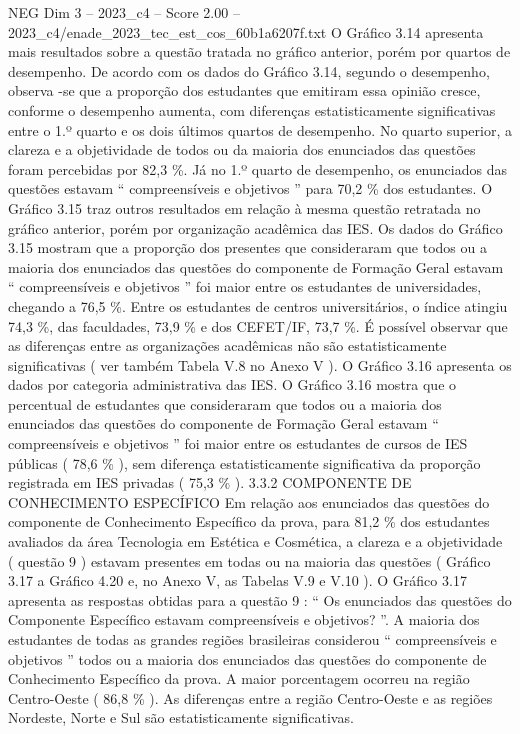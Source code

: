 \begin{textsample}{NEG Dim 3 – 2023\_c4 – Score 2.00 – 2023\_c4/enade\_2023\_tec\_est\_cos\_60b1a6207f.txt}
O Gráfico 3.14 apresenta mais resultados sobre a questão tratada no gráfico anterior, porém por quartos de desempenho.
De acordo com os dados do Gráfico 3.14, segundo o desempenho, observa -se que a proporção dos estudantes que emitiram essa opinião cresce, conforme o desempenho aumenta, com diferenças estatisticamente significativas entre o 1.º quarto e os dois últimos quartos de desempenho.
No quarto superior, a clareza e a objetividade de todos ou da maioria dos enunciados das questões foram percebidas por 82,3 \%.
Já no 1.º quarto de desempenho, os enunciados das questões estavam “ compreensíveis e objetivos ” para 70,2 \% dos estudantes.
O Gráfico 3.15 traz outros resultados em relação à mesma questão retratada no gráfico anterior, porém por organização acadêmica das IES.
Os dados do Gráfico 3.15 mostram que a proporção dos presentes que consideraram que todos ou a maioria dos enunciados das questões do componente de Formação Geral estavam “ compreensíveis e objetivos ” foi maior entre os estudantes de universidades, chegando a 76,5 \%.
Entre os estudantes de centros universitários, o índice atingiu 74,3 \%, das faculdades, 73,9 \% e dos CEFET/IF, 73,7 \%.
É possível observar que as diferenças entre as organizações acadêmicas não são estatisticamente significativas ( ver também Tabela V.8 no Anexo V ).
O Gráfico 3.16 apresenta os dados por categoria administrativa das IES.
O Gráfico 3.16 mostra que o percentual de estudantes que consideraram que todos ou a maioria dos enunciados das questões do componente de Formação Geral estavam “ compreensíveis e objetivos ” foi maior entre os estudantes de cursos de IES públicas ( 78,6 \% ), sem diferença estatisticamente significativa da proporção registrada em IES privadas ( 75,3 \% ). 3.3.2 COMPONENTE DE CONHECIMENTO ESPECÍFICO Em relação aos enunciados das questões do componente de Conhecimento Específico da prova, para 81,2 \% dos estudantes avaliados da área Tecnologia em Estética e Cosmética, a clareza e a objetividade ( questão 9 ) estavam presentes em todas ou na maioria das questões ( Gráfico 3.17 a Gráfico 4.20 e, no Anexo V, as Tabelas V.9 e V.10 ).
O Gráfico 3.17 apresenta as respostas obtidas para a questão 9 : “ Os enunciados das questões do Componente Específico estavam compreensíveis e objetivos? ”.
A maioria dos estudantes de todas as grandes regiões brasileiras considerou “ compreensíveis e objetivos ” todos ou a maioria dos enunciados das questões do componente de Conhecimento Específico da prova.
A maior porcentagem ocorreu na região Centro-Oeste ( 86,8 \% ).
As diferenças entre a região Centro-Oeste e as regiões Nordeste, Norte e Sul são estatisticamente significativas.

\end{textsample}
